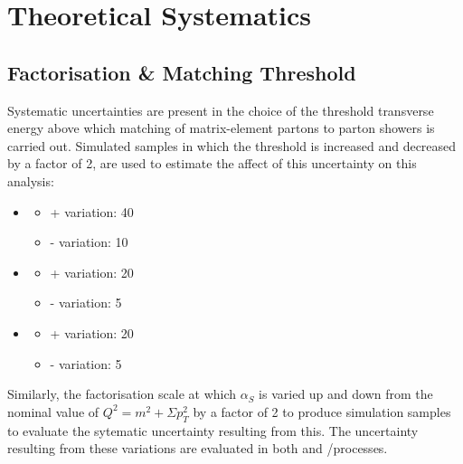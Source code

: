 
\section{Theoretical Systematics}
\label{s:Theoretical Systematics}
\subsection{Factorisation \& Matching Threshold}
\label{ss:factorisation_and_matching_threshold}
Systematic uncertainties are present in the choice of the threshold transverse energy above which matching of
matrix-element partons to parton showers is carried out. Simulated samples in which the threshold is
increased and decreased by a factor of 2, are used to estimate the affect of this uncertainty on this
analysis:

\begin{itemize}
  \item \ttbar
  \begin{itemize}
    \item + variation: 40\GeV
    \item - variation: 10\GeV
  \end{itemize}
  
  \item \WpJets
  \begin{itemize}
    \item + variation: 20\GeV
    \item - variation: 5\GeV
  \end{itemize}

  \item \ZpJets
  \begin{itemize}
    \item + variation: 20\GeV
    \item - variation: 5\GeV
  \end{itemize}
\end{itemize}

Similarly, the factorisation scale at which $\alpha_{S}$ is varied up and down from the nominal value of
$Q^{2} = m^{2} + \Sigma p_{T}^{2}$ by a factor of 2 to produce simulation samples to evaluate the sytematic
uncertainty resulting from this. The uncertainty resulting from these variations are evaluated in both \ttbar
and \W/\ZpJets processes.

